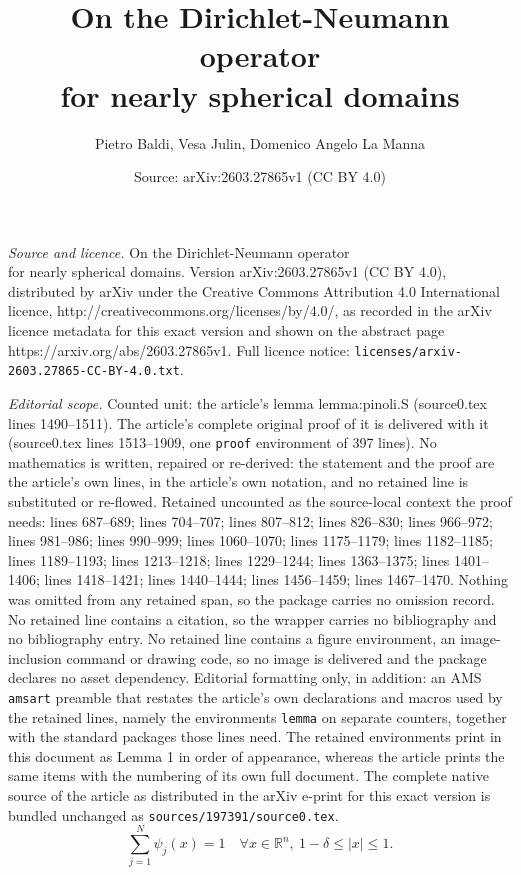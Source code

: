 \documentclass[10pt,a4paper]{amsart}
\title{On the Dirichlet-Neumann operator\\ for nearly spherical domains}
\author{Pietro Baldi, Vesa Julin, Domenico Angelo La Manna}
\date{Source: arXiv:2603.27865v1 (CC BY 4.0)}
\newcommand{\R}{{\mathbb R}}
\begin{document}
\maketitle

\noindent\emph{Source and licence.} On the Dirichlet-Neumann operator\\ for nearly spherical domains. Version arXiv:2603.27865v1 (CC BY 4.0), distributed by arXiv under the Creative Commons Attribution 4.0 International licence, http://creativecommons.org/licenses/by/4.0/, as recorded in the arXiv licence metadata for this exact version and shown on the abstract page https://arxiv.org/abs/2603.27865v1. Full licence notice: \texttt{licenses/arxiv-2603.27865-CC-BY-4.0.txt}.\par\smallskip

\noindent\textit{Editorial scope.} Counted unit: the article's lemma lemma:pinoli.S (source0.tex lines 1490--1511). The article's complete original proof of it is delivered with it (source0.tex lines 1513--1909, one \texttt{proof} environment of 397 lines). No mathematics is written, repaired or re-derived: the statement and the proof are the article's own lines, in the article's own notation, and no retained line is substituted or re-flowed.  Retained uncounted as the source-local context the proof needs: lines 687--689; lines 704--707; lines 807--812; lines 826--830; lines 966--972; lines 981--986; lines 990--999; lines 1060--1070; lines 1175--1179; lines 1182--1185; lines 1189--1193; lines 1213--1218; lines 1229--1244; lines 1363--1375; lines 1401--1406; lines 1418--1421; lines 1440--1444; lines 1456--1459; lines 1467--1470.  Nothing was omitted from any retained span, so the package carries no omission record.  No retained line contains a citation, so the wrapper carries no bibliography and no bibliography entry.  No retained line contains a figure environment, an image-inclusion command or drawing code, so no image is delivered and the package declares no asset dependency.  Editorial formatting only, in addition: an AMS \texttt{amsart} preamble that restates the article's own declarations and macros used by the retained lines, namely the environments \texttt{lemma} on separate counters, together with the standard packages those lines need.  The retained environments print in this document as Lemma 1 in order of appearance, whereas the article prints the same items with the numbering of its own full document.  The complete native source of the article as distributed in the arXiv e-print for this exact version is bundled unchanged as \texttt{sources/197391/source0.tex}.
\begin{equation} \label{res.unity.in.the.annulus}
\sum_{j=1}^N \psi_j(x) = 1 \quad \forall x \in \R^n, \  1-\delta \leq |x| \leq 1.
\end{equation}
\end{document}
